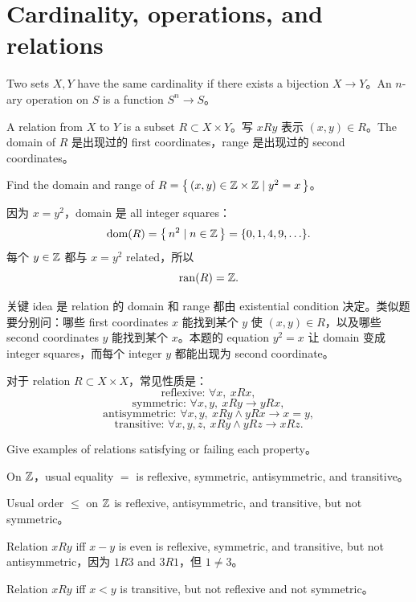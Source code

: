 \section{Cardinality, operations, and relations}

Two sets \(X,Y\) have the same cardinality if there exists a bijection \(X\to Y\)。An \(n\)-ary operation on \(S\) is a function \(S^n\to S\)。

A relation from \(X\) to \(Y\) is a subset \(R\subset X\times Y\)。写 \(xRy\) 表示 \((x,y)\in R\)。The domain of \(R\) 是出现过的 first coordinates，range 是出现过的 second coordinates。

\begin{exerciseblock}
Find the domain and range of \(R=\left\{\,(x,y)\in\mathbb{Z}\times\mathbb{Z}\mid y^2=x\,\right\}\)。
\end{exerciseblock}

\begin{solution}
因为 \(x=y^2\)，domain 是 all integer squares：
\[
\operatorname{dom}(R)=\left\{\,n^2\mid n\in\mathbb{Z}\,\right\}=\{0,1,4,9,\ldots\}.
\]
每个 \(y\in\mathbb{Z}\) 都与 \(x=y^2\) related，所以
\[
\operatorname{ran}(R)=\mathbb{Z}.
\]
\end{solution}

\begin{explanation}
关键 idea 是 relation 的 domain 和 range 都由 existential condition 决定。类似题要分别问：哪些 first coordinates \(x\) 能找到某个 \(y\) 使 \((x,y)\in R\)，以及哪些 second coordinates \(y\) 能找到某个 \(x\)。本题的 equation \(y^2=x\) 让 domain 变成 integer squares，而每个 integer \(y\) 都能出现为 second coordinate。
\end{explanation}

对于 relation \(R\subset X\times X\)，常见性质是：
\[
\text{reflexive: }\forall x,\ xRx,
\]
\[
\text{symmetric: }\forall x,y,\ xRy\to yRx,
\]
\[
\text{antisymmetric: }\forall x,y,\ xRy\land yRx\to x=y,
\]
\[
\text{transitive: }\forall x,y,z,\ xRy\land yRz\to xRz.
\]

\begin{exerciseblock}
Give examples of relations satisfying or failing each property。
\end{exerciseblock}

\begin{solution}
On \(\mathbb{Z}\)，usual equality \(=\) is reflexive, symmetric, antisymmetric, and transitive。

Usual order \(\le\) on \(\mathbb{Z}\) is reflexive, antisymmetric, and transitive, but not symmetric。

Relation \(xRy\) iff \(x-y\) is even is reflexive, symmetric, and transitive, but not antisymmetric，因为 \(1R3\) and \(3R1\)，但 \(1\ne3\)。

Relation \(xRy\) iff \(x<y\) is transitive, but not reflexive and not symmetric。
\end{solution}


